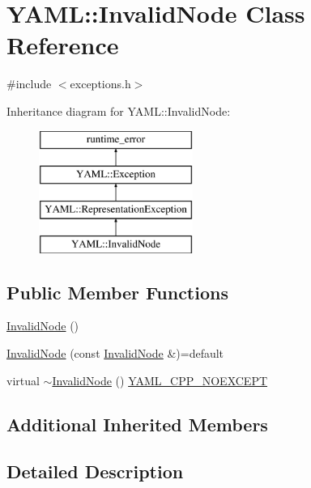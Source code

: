 \hypertarget{class_y_a_m_l_1_1_invalid_node}{}\section{Y\+A\+ML\+::Invalid\+Node Class Reference}
\label{class_y_a_m_l_1_1_invalid_node}


{\ttfamily \#include $<$exceptions.\+h$>$}

Inheritance diagram for Y\+A\+ML\+::Invalid\+Node\+:\begin{figure}[H]
\begin{center}
\leavevmode
\includegraphics[height=4.000000cm]{class_y_a_m_l_1_1_invalid_node}
\end{center}
\end{figure}
\subsection*{Public Member Functions}
\begin{DoxyCompactItemize}
\item 
\mbox{\hyperlink{class_y_a_m_l_1_1_invalid_node_a8e42feaf0f7d9be12167b276c260233f}{Invalid\+Node}} ()
\item 
\mbox{\hyperlink{class_y_a_m_l_1_1_invalid_node_af056baa27932955773b70a8d67401f38}{Invalid\+Node}} (const \mbox{\hyperlink{class_y_a_m_l_1_1_invalid_node}{Invalid\+Node}} \&)=default
\item 
virtual \mbox{\hyperlink{class_y_a_m_l_1_1_invalid_node_a5fee1417786dc94b7e39df837304d38e}{$\sim$\+Invalid\+Node}} () \mbox{\hyperlink{exceptions_8cpp_a4ea58eb0a28000364858d4942add7d1a}{Y\+A\+M\+L\+\_\+\+C\+P\+P\+\_\+\+N\+O\+E\+X\+C\+E\+PT}}
\end{DoxyCompactItemize}
\subsection*{Additional Inherited Members}


\subsection{Detailed Description}


